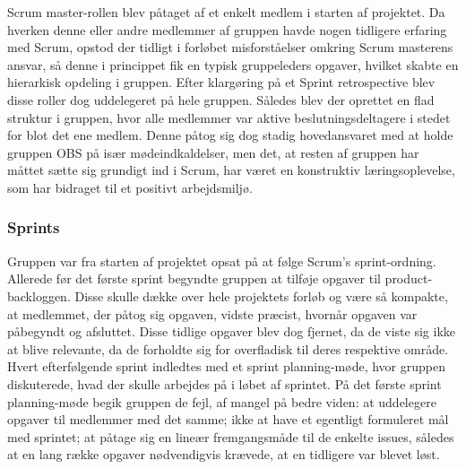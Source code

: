 Scrum master-rollen blev påtaget af et enkelt medlem i starten af projektet. Da hverken denne eller andre medlemmer af gruppen havde nogen tidligere erfaring 
med Scrum, opstod der tidligt i forløbet misforståelser omkring Scrum masterens ansvar, så denne i princippet fik en typisk gruppeleders opgaver, hvilket 
skabte en hierarkisk opdeling i gruppen. Efter klargøring på et Sprint retrospective blev disse roller dog uddelegeret på hele gruppen. Således blev der 
oprettet en flad struktur i gruppen, hvor alle medlemmer var aktive beslutningsdeltagere i stedet for blot det ene medlem. Denne påtog sig dog stadig 
hovedansvaret med at holde gruppen
OBS på især mødeindkaldelser, men det, at resten af gruppen har måttet sætte sig grundigt ind i Scrum, har været en konstruktiv læringsoplevelse, som har
bidraget til et positivt arbejdsmiljø.

\subsubsection{Sprints}
Gruppen var fra starten af projektet opsat på at følge Scrum's sprint-ordning. Allerede før det første sprint begyndte gruppen at tilføje opgaver til 
product-backloggen. Disse skulle dække over hele projektets forløb og være så kompakte, at medlemmet, der påtog sig opgaven, vidste præcist, hvornår opgaven 
var påbegyndt og afsluttet. Disse tidlige opgaver blev dog fjernet, da de viste sig ikke at blive relevante, da de forholdte sig for overfladisk til deres 
respektive område. Hvert efterfølgende sprint indledtes med et sprint planning-møde, hvor gruppen diskuterede, hvad der skulle arbejdes på i løbet af sprintet.
 På det første sprint planning-møde begik gruppen de fejl, af mangel på bedre viden: at uddelegere opgaver til medlemmer med det samme; ikke at have et 
 egentligt formuleret mål med sprintet; at påtage sig en lineær fremgangsmåde til de enkelte issues, således at en lang række opgaver nødvendigvis krævede, 
 at en tidligere var blevet løst.

